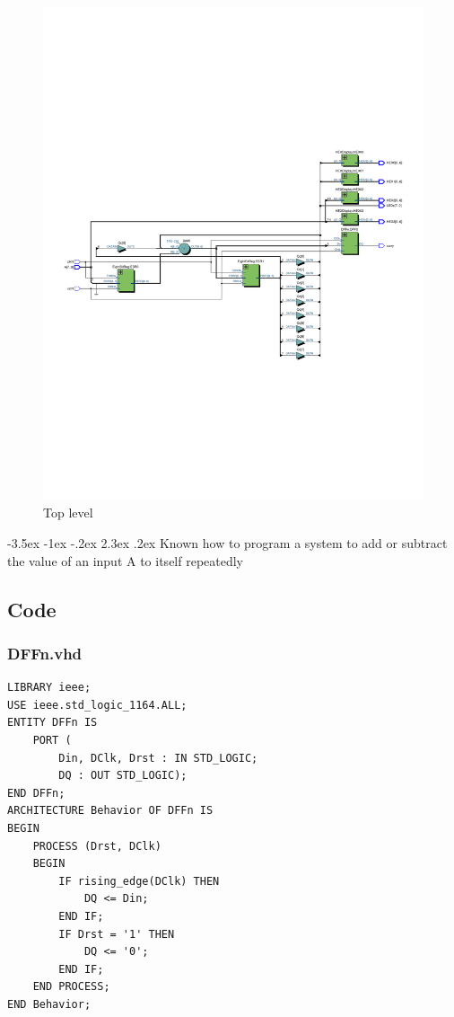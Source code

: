 \documentclass[13pt,a4paper]{report}
\makeatletter
\renewcommand\section{\@startsection {section}{1}{-1em}%
  {-3.5ex \@plus -1ex \@minus -.2ex}%
  {2.3ex \@plus.2ex}%
  {\normalfont\Large\bfseries}}
\makeatother
\begin{document}
\begin{figure}[H]
\centering
\includegraphics[scale=0.85, clip, trim={0cm 8cm 0cm 8cm}]{images/Exc1_RTL.pdf}
\caption*{Top level}
\end{figure}

\section{Known how to program a system to add or subtract the value of an input A to itself repeatedly}

\subsection{Code}
\subsubsection{DFFn.vhd}
\begin{verbatim}
LIBRARY ieee;
USE ieee.std_logic_1164.ALL;
ENTITY DFFn IS
	PORT (
		Din, DClk, Drst : IN STD_LOGIC;
		DQ : OUT STD_LOGIC);
END DFFn;
ARCHITECTURE Behavior OF DFFn IS
BEGIN
	PROCESS (Drst, DClk)
	BEGIN
		IF rising_edge(DClk) THEN
			DQ <= Din;
		END IF;
		IF Drst = '1' THEN
			DQ <= '0';
		END IF;
	END PROCESS;
END Behavior;
\end{verbatim}
\end{document}
